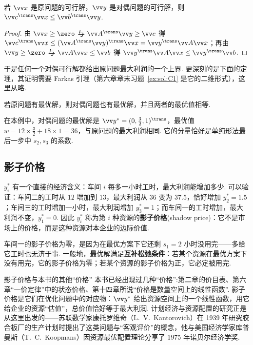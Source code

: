 \begin{theorem}[弱对偶定理]
	若 $\vv x$ 是原问题的可行解，$\vv y$ 是对偶问题的可行解，则 $\vv c^\trans\vv x\le\vv b^\trans\vv y$.
\end{theorem}
\begin{proof}
	由 $\vv x\ge\zero$ 与 $\vv A^\trans\vv y\ge\vv c$ 得 $\vv c^\trans\vv x\le(\vv A^\trans\vv y)^\trans\vv x=\vv y^\trans\vv A\vv x$；再由 $\vv y\ge\zero$ 与 $\vv A\vv x\le\vv b$ 得 $\vv y^\trans\vv A\vv x\le\vv y^\trans\vv b$.
\end{proof}

于是任何一个对偶可行解都给出原问题最大利润的一个上界. 更深刻的是下面的定理，其证明需要 Farkas 引理（第六章章末习题~\ref{ex:sol:C1} 是它的二维形式），这里从略.

\begin{theorem}[强对偶定理]
	若原问题有最优解，则对偶问题也有最优解，并且两者的最优值相等.
\end{theorem}

在本例中，对偶问题的最优解是 $\vv y^*=(0,\frac32,1)^\trans$，最优值 $w=12\times\frac32+18\times1=36$，与原问题的最大利润相同. 它的分量恰好是单纯形法最后一步中 $s_2,s_3$ 的系数.

\subsection{影子价格}

$y_i^*$ 有一个直接的经济含义：车间 $i$ 每多一小时工时，最大利润能增加多少. 可以验证：车间二的工时从 $12$ 增加到 $13$，最大利润从 $36$ 变为 $37.5$，恰好增加 $y_2^*=1.5$；车间三的工时增加一小时，最大利润增加 $y_3^*=1$；而车间一的工时增加，最大利润不变，$y_1^*=0$. 因此 $y_i^*$ 称为第 $i$ 种资源的\textbf{影子价格}(shadow price)：它不是市场上的价格，而是这种资源对本企业的边际价值.

车间一的影子价格为零，是因为在最优方案下它还剩 $s_1=2$ 小时没用完——多给它工时也无济于事. 一般地，最优解满足\textbf{互补松弛条件}：若某个资源在最优方案下没有用完，它的影子价格为零；若某个资源的影子价格为正，它必定被用完.

\begin{linkbox}{影子价格与本书的其他“价格”}
	本书已经出现过几种“价格”:第二章的价目表、第六章“一价定律”中的状态价格、第十四章所说“价格是数量空间上的线性函数”. 影子价格是它们在优化问题中的对应物：$\vv y^*$ 给出资源空间上的一个线性函数，用它给企业的资源“估值”，总价值恰好等于最大利润. 计划经济与资源配置的研究正是从这里出发的——苏联数学家康托罗维奇（L.~V.~Kantorovich）在 1939 年研究胶合板厂的生产计划时提出了这类问题与“客观评价”的概念\cite{kantorovich1960mathematical}，他与美国经济学家库普曼斯（T.~C.~Koopmans）因资源最优配置理论分享了 1975 年诺贝尔经济学奖.
\end{linkbox}


